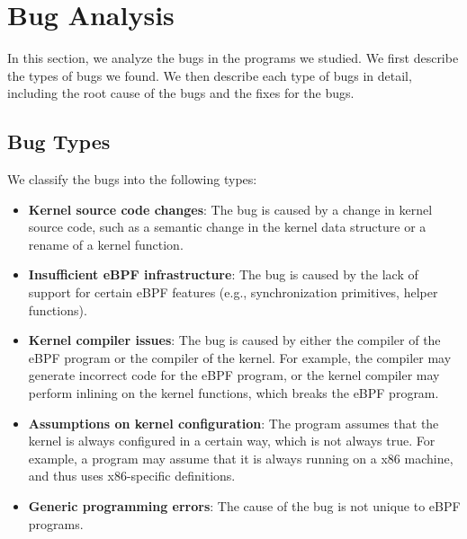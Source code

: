 


\section{Bug Analysis}
In this section, we analyze the bugs in the programs we studied.
We first describe the types of bugs we found.
We then describe each type of bugs in detail, including the root cause of the bugs and the fixes for the bugs.

\subsection{Bug Types}
We classify the bugs into the following types:
\begin{itemize}
  \item \textbf{Kernel source code changes}: The bug is caused by a change in kernel source code, such as a semantic change in the kernel data structure or a rename of a kernel function.
  \item \textbf{Insufficient eBPF infrastructure}: The bug is caused by the lack of support for certain eBPF features (e.g., synchronization primitives, helper functions).
  \item \textbf{Kernel compiler issues}: The bug is caused by either the compiler of the eBPF program or the compiler of the kernel. For example, the compiler may generate incorrect code for the eBPF program, or the kernel compiler may perform inlining on the kernel functions, which breaks the eBPF program.
  \item \textbf{Assumptions on kernel configuration}: The program assumes that the kernel is always configured in a certain way, which is not always true. For example, a program may assume that it is always running on a x86 machine, and thus uses x86-specific definitions.
  \item \textbf{Generic programming errors}: The cause of the bug is not unique to eBPF programs.
\end{itemize}

